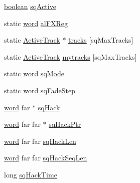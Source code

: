 \begin{DoxyCompactItemize}
\hyperlink{ID__HEAD_8H_a7c6368b321bd9acd0149b030bb8275ed}{boolean} \hyperlink{ID__SD_8C_a9a9dc3817c917f6707f308b7990cf6eb}{sqActive}
\item 
static \hyperlink{ID__HEAD_8H_abad51e07ab6d26bec9f1f786c8d65bcd}{word} \hyperlink{ID__SD_8C_af75a7f9861fb535b8d8ab10108148245}{alFXReg}
\item 
static \hyperlink{structActiveTrack}{ActiveTrack} $\ast$ \hyperlink{ID__SD_8C_a1f3baa4768a9637adddbaee049d33b53}{tracks} \mbox{[}sqMaxTracks\mbox{]}
\item 
static \hyperlink{structActiveTrack}{ActiveTrack} \hyperlink{ID__SD_8C_a0917c582991c0b2d37dbe77956aa94b5}{mytracks} \mbox{[}sqMaxTracks\mbox{]}
\item 
static \hyperlink{ID__HEAD_8H_abad51e07ab6d26bec9f1f786c8d65bcd}{word} \hyperlink{ID__SD_8C_ac2982e37cfe58736748373d4b6fde990}{sqMode}
\item 
static \hyperlink{ID__HEAD_8H_abad51e07ab6d26bec9f1f786c8d65bcd}{word} \hyperlink{ID__SD_8C_a66270c63fa51ed1b83f45280950157fa}{sqFadeStep}
\item 
\hyperlink{ID__HEAD_8H_abad51e07ab6d26bec9f1f786c8d65bcd}{word} far $\ast$ \hyperlink{ID__SD_8C_a88379c948bdd60bfed55a29a7614c191}{sqHack}
\item 
\hyperlink{ID__HEAD_8H_abad51e07ab6d26bec9f1f786c8d65bcd}{word} far far $\ast$ \hyperlink{ID__SD_8C_a095fec841fbb98e55b05ef2ef80420ff}{sqHackPtr}
\item 
\hyperlink{ID__HEAD_8H_abad51e07ab6d26bec9f1f786c8d65bcd}{word} far far \hyperlink{ID__SD_8C_aee7a7f98a0ae5f84e98b024b9b863fc9}{sqHackLen}
\item 
\hyperlink{ID__HEAD_8H_abad51e07ab6d26bec9f1f786c8d65bcd}{word} far far \hyperlink{ID__SD_8C_ac2de5c298e18c54886c534938d16229e}{sqHackSeqLen}
\item 
long \hyperlink{ID__SD_8C_aa1f6ea8a7e5c678d30c38c663d1ba776}{sqHackTime}
\end{DoxyCompactItemize}


